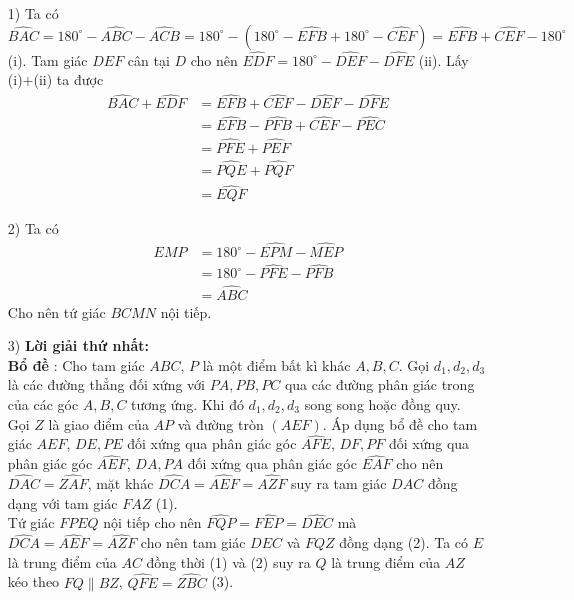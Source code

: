 \begin{ex}
{\begin{center}
\begin{tikzpicture}[thick,scale=1.4]
\end{tikzpicture}
\end{center}
\begin{enumerate}
\item[1)] Ta có $\widehat{BAC} = 180^\circ - \widehat{ABC} - \widehat{ACB} = 180^\circ - \left ( 
180^\circ -\widehat{EFB} + 180^\circ -\widehat{CEF} \right ) = \widehat{EFB} +\widehat{CEF}- 180^\circ $  (i).
Tam giác $DEF$ cân tại $D$ cho nên $\widehat{EDF} = 180^\circ - \widehat{DEF} - \widehat{DFE}$ (ii). 
Lấy (i)+(ii) ta được 
\begin{align*}
\widehat{BAC} +\widehat{EDF} 
&= \widehat{EFB} +\widehat{CEF} - \widehat{DEF} - \widehat{DFE}\\ 
&= \widehat{EFB}- \widehat{PFB} +\widehat{CEF}-\widehat{PEC}\\
&=\widehat{PFE} +\widehat{PEF} \\
&=\widehat{PQE} +\widehat{PQF} \\
&= \widehat{EQF}
\end{align*}
\item[2)] Ta có 
\begin{align*}
\widehat{EMP} &=180^\circ - \widehat{EPM} -\widehat{MEP}  \\
                             &=180^\circ - \widehat{PFE} -\widehat{PFB}  \\
                             &=\widehat{ABC}
\end{align*}
Cho nên  tứ giác $BCMN$ nội tiếp. 
\item[3)] \textbf{Lời giải thứ nhất:} \\ 
\textbf{Bổ đề }: Cho tam giác $ABC$, $P$ là một điểm bất kì khác $A,B,C$. Gọi $d_1,d_2,d_3$ là các đường thẳng đối xứng với  $PA,PB,PC$ qua các đường phân giác trong của các góc $A,B,C$ tương ứng. Khi đó $d_1,d_2,d_3$ song song hoặc đồng quy.   \\
Gọi $Z$ là giao điểm của $AP$ và đường tròn $(AEF)$. Áp dụng bổ đề cho tam giác $AEF$, $DE,PE$ đối xứng qua 
phân giác góc $\widehat{AFE}$, $DF,PF$ đối xứng qua  phân giác góc $\widehat{AEF}$, $DA,PA$ đối xứng qua 
phân giác góc $\widehat{EAF}$ cho nên $\widehat{DAC} = \widehat{ZAF}$, mặt khác $\widehat{DCA} = \widehat{AEF} = \widehat{AZF}$ suy ra tam giác $DAC$ đồng dạng với tam giác $FAZ$ (1). \\
Tứ giác $FPEQ$ nội tiếp cho nên $\widehat{FQP} = \widehat{FEP} = \widehat{DEC}$ mà $\widehat{DCA} = \widehat{AEF} = \widehat{AZF}$ cho nên tam giác $DEC$ và $FQZ$ đồng dạng (2). Ta có $E$ là trung điểm của $AC$ đồng thời (1) và (2) suy ra $Q$ là trung điểm của $AZ$ kéo theo $FQ \parallel BZ$, $\widehat{QFE} =\widehat{ZBC}$ (3). \\ 

\end{enumerate}}
\end{ex}
